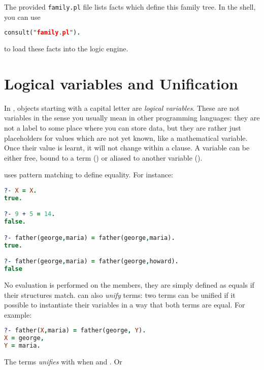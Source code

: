 \documentclass{../../../tp}
\begin{document}
The provided \verb|family.pl| file lists facts which define this family tree. In the \prolog shell, you can use

\begin{lstlisting}[language=prolog]
	consult("family.pl").
\end{lstlisting} 

to load these facts into the logic engine.

\section{Logical variables and Unification}

In \prolog, objects starting with a capital letter are \emph{logical variables}. These are not variables in the sense you usually mean in other programming languages: they are not a label to some place where you can store data, but they are rather just placeholders for values which are not yet known, like a mathematical variable. Once their value is learnt, it will not change within a clause. A variable can be either free, bound to a term () or aliased to another variable ().

\prolog uses pattern matching to define equality. For instance: 

\begin{lstlisting}[language=prolog]
?- X = X.
true.

?- 9 + 5 = 14.
false.

?- father(george,maria) = father(george,maria).
true.

?- father(george,maria) = father(george,howard).
false
\end{lstlisting} 

No evaluation is performed on the members, they are simply defined as equals if their structures match. \prolog can also \emph{unify} terms: two terms can be unified if it possible to instantiate their variables in a way that both terms are equal. For example:


\begin{lstlisting}[language=prolog]
?- father(X,maria) = father(george, Y).
X = george,
Y = maria.
\end{lstlisting} 

The terms  \emph{unifies} with  when  and . Or 
 
 
\end{document}
